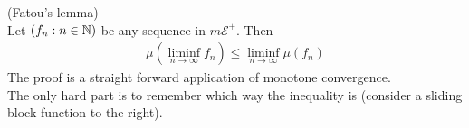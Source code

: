 \documentclass[a4paper]{article}
\begin{document}
\begin{lemma} (Fatou's lemma)\\
Let $(f_n:n \in \mathbb{N})$ be any sequence in $m\mathcal{E}^+$. Then 
\begin{equation*}
\begin{aligned}
\mu(\liminf_{n\to \infty} f_n) \leq \liminf_{n \to \infty} \mu(f_n)
\end{aligned}
\end{equation*}
The proof is a straight forward application of monotone convergence.\\
The only hard part is to remember which way the inequality is (consider a sliding block function to the right).
\end{lemma}
\end{document}
